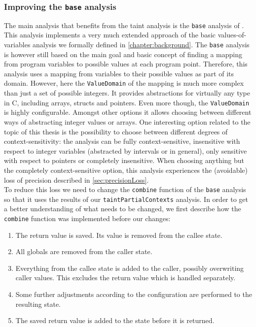     \subsubsection{Improving the \texttt{base} analysis}
      The main analysis that benefits from the taint analysis is the \texttt{base} analysis of \gob. This analysis implements a very much extended approach of the basic values-of-variables analysis we formally defined in \autoref{chapter:background}. The \texttt{base} analysis is however still based on the main goal and basic concept of finding a mapping from program variables to possible values at each program point. Therefore, this analysis uses a mapping from variables to their possible values as part of its domain. However, here the \texttt{ValueDomain} of the mapping is much more complex than just a set of possible integers. It provides abstractions for virtually any type in C, including arrays, structs and pointers. Even more though, the \texttt{ValueDomain} is highly configurable. Amongst other options it allows choosing between different ways of abstracting integer values or arrays. One interesting option related to the topic of this thesis is the possibility to choose between different degrees of context-sensitivity: the analysis can be fully context-sensitive, insensitive with respect to integer variables (abstracted by intervals or in general), only sensitive with respect to pointers or completely insensitive. When choosing anything but the completely context-sensitive option, this analysis experiences the (avoidable) loss of precision described in \autoref{sec:precisionLoss}.\\
      To reduce this loss we need to change the \texttt{combine} function of the \texttt{base} analysis so that it uses the results of our \texttt{taintPartialContexts} analysis. In order to get a better understanding of what needs to be changed, we first describe how the \texttt{combine} function was implemented before our changes:
      \begin{enumerate}
        \item The return value is saved. Its value is removed from the callee state.
        \item All globals are removed from the caller state.
        \item Everything from the callee state is added to the caller, possibly overwriting caller values. This excludes the return value which is handled separately.
        \item Some further adjustments according to the configuration are performed to the resulting state.
        \item The saved return value is added to the state before it is returned.
      \end{enumerate}
